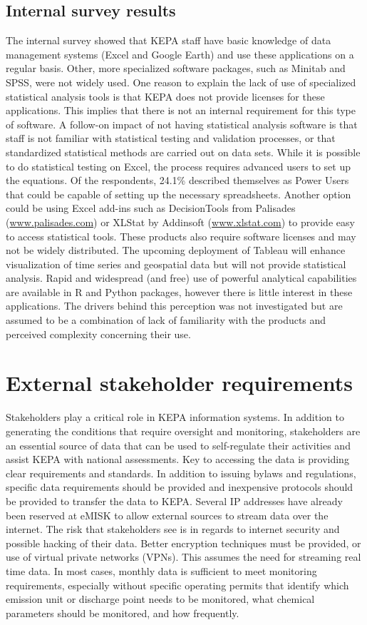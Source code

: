 \subsection{Internal survey results}
The internal survey showed that KEPA staff have basic knowledge of data management systems (Excel and Google Earth) and use these applications on a regular basis. Other, more specialized software packages, such as Minitab and SPSS, were not widely used. One reason to explain the lack of use of specialized statistical analysis tools is that KEPA does not provide licenses for these applications. This implies that there is not an internal requirement for this type of software. A follow-on impact of not having statistical analysis software is that staff is not familiar with statistical testing and validation processes, or that standardized statistical methods are carried out on data sets. While it is possible to do statistical testing on Excel, the process requires advanced users to set up the equations. Of the respondents, 24.1\% described themselves as Power Users that could be capable of setting up the necessary spreadsheets. Another option could be using Excel add-ins such as DecisionTools from Palisades (\url{www.palisades.com}) or XLStat by Addinsoft (\url{www.xlstat.com}) to provide easy to access statistical tools.  These products also require software licenses and may not be widely distributed. The upcoming deployment of Tableau will enhance visualization of time series and geospatial data but will not provide statistical analysis. Rapid and widespread (and free) use of powerful analytical capabilities are available in R and Python packages, however there is little interest in these applications. The drivers behind this perception was not investigated but are assumed to be a combination of lack of familiarity with the products and perceived complexity concerning their use. 

\section{External stakeholder requirements}

Stakeholders play a critical role in KEPA information systems. In addition to generating the conditions that require oversight and monitoring, stakeholders are an essential source of data that can be used to self-regulate their activities and assist KEPA with national assessments. Key to accessing the data is providing clear requirements and standards. In addition to issuing bylaws and regulations, specific data requirements should be provided and inexpensive protocols should be provided to transfer the data to KEPA. Several IP addresses have already been reserved at eMISK to allow external sources to stream data over the internet. The risk that stakeholders see is in regards to internet security and possible hacking of their data. Better encryption techniques must be provided, or use of virtual private networks (VPNs). This assumes the need for streaming real time data. In most cases, monthly data is sufficient to meet monitoring requirements, especially without specific operating permits that identify which emission unit or discharge point needs to be monitored, what chemical parameters should be monitored, and how frequently.

